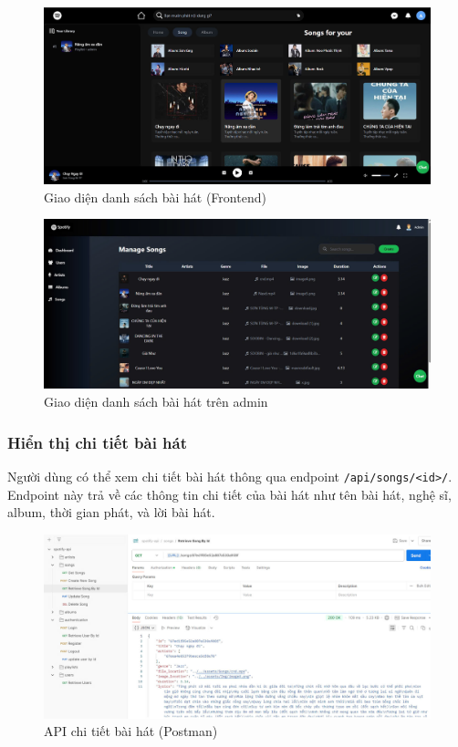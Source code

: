 \begin{figure}[H]
    \centering
    \includegraphics[width=1\textwidth]{latex/imgs/frontend-songs.jpg}
    \caption{Giao diện danh sách bài hát (Frontend)}
\end{figure}
\begin{figure}[H]
    \centering
    \includegraphics[width=1\textwidth]{latex/imgs/frontend-admin-songs.jpg}
    \caption{Giao diện danh sách bài hát trên admin}
\end{figure}

\subsubsection{Hiển thị chi tiết bài hát}
Người dùng có thể xem chi tiết bài hát thông qua endpoint \texttt{/api/songs/<id>/}. Endpoint này trả về các thông tin chi tiết của bài hát như tên bài hát, nghệ sĩ, album, thời gian phát, và lời bài hát.

\begin{figure}[H]
    \centering
    \includegraphics[width=1\textwidth]{latex/imgs/api-song-detail.jpg}
    \caption{API chi tiết bài hát (Postman)}
\end{figure}

